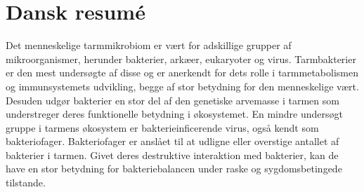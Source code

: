 \chapter{Dansk resumé}

Det menneskelige tarmmikrobiom er vært for adskillige grupper af mikroorganismer, herunder bakterier, arkæer, eukaryoter og virus. Tarmbakterier er den mest undersøgte af disse og er anerkendt for dets rolle i tarmmetabolismen og immunsystemets udvikling, begge af stor betydning for den menneskelige vært. Desuden udgør bakterier en stor del af den genetiske arvemasse i tarmen som understreger deres funktionelle betydning i økosystemet. En mindre undersøgt gruppe i tarmens økosystem er bakterieinficerende virus, også kendt som bakteriofager. Bakteriofager er anslået til at udligne eller overstige antallet af bakterier i tarmen. Givet deres destruktive interaktion med bakterier, kan de have en stor betydning for bakteriebalancen under raske og sygdomsbetingede tilstande. 
